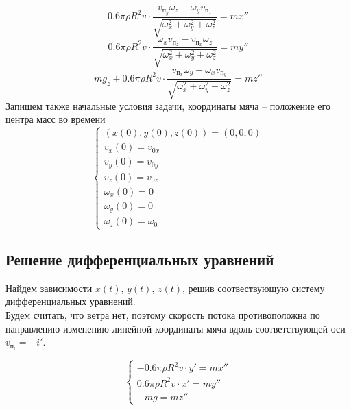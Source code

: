 \documentclass[a5paper, 10pt]{article}
\theoremstyle{definition}
\theoremstyle{plain}
\theoremstyle{remark}
\begin{document}
\begin{equation}
0.6 \pi \rho  R^{2} v  \cdot  \frac{ v_{\text{п}_{y}} \omega _{z} - \omega _{y} v_{\text{п}_{z}}}{  \sqrt{\omega _{x}^2+\omega _{y}^2+\omega _{z}^2}} = m x''
\end{equation}
\begin{equation}
0.6 \pi \rho  R^{2} v  \cdot  \frac{ \omega _{x} v_{\text{п}_{z}} - v_{\text{п}_{x}} \omega _{z}}{ \sqrt{\omega _{x}^2+\omega _{y}^2+\omega _{z}^2}} = m y''
\end{equation}
\begin{equation}
m g_{z}+0.6 \pi \rho  R^{2} v  \cdot  \frac{v_{\text{п}_{x}} \omega _{y} - \omega _{x} v_{\text{п}_{y}} }{ \sqrt{\omega _{x}^2+\omega _{y}^2+\omega _{z}^2}} = m z''
\end{equation}
Запишем также начальные условия задачи, координаты мяча -- положение его центра масс во времени
\begin{equation}
\begin{cases}
\left(x (0), y(0), z(0) \right)  = \left(0, 0, 0\right)\\
v_{x} (0) = v_{0x}\\
v_{y} (0) = v_{0y}\\
v_{z} (0) = v_{0z}\\
\omega_{x} (0) = 0\\
\omega_{y} (0) = 0\\
\omega_{z} (0) = \omega_{0}
\end{cases}
\end{equation}
\subsection{Решение дифференциальных уравнений}
Найдем зависимости $x(t)$, $y(t)$, $z(t)$, решив соотвествующую систему дифференциальных уравнений.\\
Будем считать, что ветра нет, поэтому скорость потока противоположна по направлению изменению линейной координаты мяча вдоль соответствующей оси $v_{\text{п}_{i}} = -i'$.


\begin{equation}
\begin{cases}
- 0.6 \pi \rho  R^{2} v \cdot  y' = m x''\\
0.6 \pi \rho  R^{2} v \cdot   x'  = m y''\\
-m g  = m z''
\end{cases}
\end{equation}
\end{document}
